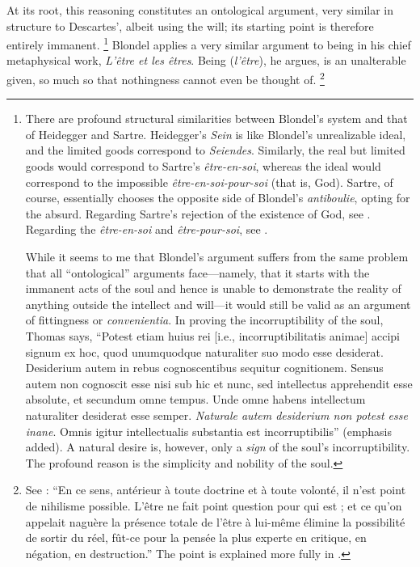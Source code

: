 %
At its root, this reasoning constitutes an ontological argument, very similar in structure to Descartes', albeit using the will; its starting point is therefore entirely immanent.%
%
\footnote{There are profound structural similarities between Blondel's system and that of Heidegger and Sartre. Heidegger's \emph{Sein} is like Blondel's unrealizable ideal, and the limited goods correspond to \emph{Seiendes}. Similarly, the real but limited goods would correspond to Sartre's \emph{être-en-soi}, whereas the ideal would correspond to the impossible \emph{être-en-soi-pour-soi} (that is, God). Sartre, of course, essentially chooses the opposite side of Blondel's \emph{antiboulie}, opting for the absurd. Regarding Sartre's rejection of the existence of God, see \cite[32--35]{lucas:orizzonte}. Regarding the \emph{être-en-soi} and \emph{être-pour-soi}, see \cite[115--119]{definance:essai}.

While it seems to me that Blondel's argument suffers from the same problem that all ``ontological'' arguments face---namely, that it starts with the immanent acts of the soul and hence is unable to demonstrate the reality of anything outside the intellect and will---it would still be valid as an argument of fittingness or \emph{convenientia}. In proving the incorruptibility of the soul, Thomas says,
``Potest etiam huius rei [i.e., incorruptibilitatis animae] accipi signum ex hoc, quod unumquodque naturaliter suo modo esse desiderat. Desiderium autem in rebus cognoscentibus sequitur cognitionem. Sensus autem non cognoscit esse nisi sub hic et nunc, sed intellectus apprehendit esse absolute, et secundum omne tempus. Unde omne habens intellectum naturaliter desiderat esse semper. \emph{Naturale autem desiderium non potest esse inane}. Omnis igitur intellectualis substantia est incorruptibilis'' (emphasis added).
A natural desire is, however, only a \emph{sign} of the soul's incorruptibility. The profound reason is the simplicity and nobility of the soul.}
%
Blondel applies a very similar argument to being in his chief metaphysical work, \emph{L'être et les êtres}. Being (\emph{l'être}), he argues, is an unalterable given, so much so that nothingness cannot even be thought of.%
%
\footnote{See \cite[8]{blondel:etre}: ``En ce sens, antérieur à toute doctrine et à toute volonté, il n'est point de nihilisme possible. L'être ne fait point question pour qui est ; et ce qu'on appelait naguère la présence totale de l'être à lui-même élimine la possibilité de sortir du réel, fût-ce pour la pensée la plus experte en critique, en négation, en destruction.'' The point is explained more fully in \cite[37--38]{blondel:etre}.}
